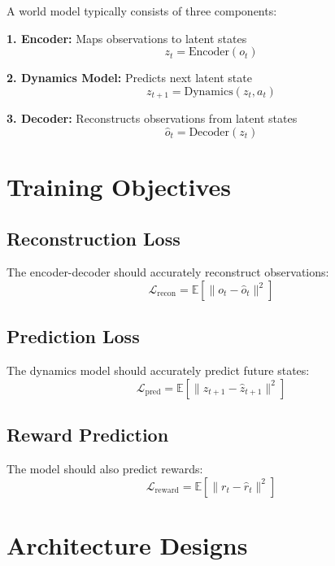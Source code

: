 A world model typically consists of three components:

\textbf{1. Encoder:} Maps observations to latent states
\begin{equation}
    z_t = \text{Encoder}(o_t)
\end{equation}

\textbf{2. Dynamics Model:} Predicts next latent state
\begin{equation}
    z_{t+1} = \text{Dynamics}(z_t, a_t)
\end{equation}

\textbf{3. Decoder:} Reconstructs observations from latent states
\begin{equation}
    \hat{o}_t = \text{Decoder}(z_t)
\end{equation}

\section{Training Objectives}

\subsection{Reconstruction Loss}

The encoder-decoder should accurately reconstruct observations:
\begin{equation}
    \mathcal{L}_{\text{recon}} = \mathbb{E}[\|o_t - \hat{o}_t\|^2]
\end{equation}

\subsection{Prediction Loss}

The dynamics model should accurately predict future states:
\begin{equation}
    \mathcal{L}_{\text{pred}} = \mathbb{E}[\|z_{t+1} - \hat{z}_{t+1}\|^2]
\end{equation}

\subsection{Reward Prediction}

The model should also predict rewards:
\begin{equation}
    \mathcal{L}_{\text{reward}} = \mathbb{E}[\|r_t - \hat{r}_t\|^2]
\end{equation}

\section{Architecture Designs}

